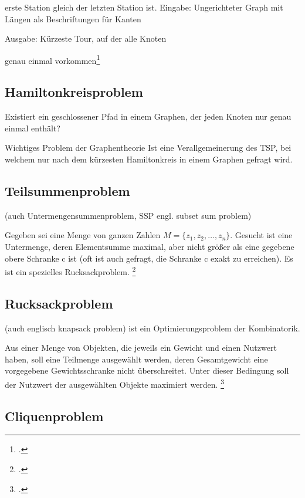 \documentclass{lehramt-informatik-haupt}
\begin{document}
erste Station gleich der letzten Station ist. Eingabe: Ungerichteter
Graph mit Längen als Beschriftungen für Kanten

Ausgabe: Kürzeste Tour, auf der alle Knoten

genau einmal vorkommen\footcite[Seite 73]{theo:fs:4}

%

\subsection{Hamiltonkreisproblem}

Existiert ein geschlossener Pfad in einem
Graphen, der jeden Knoten nur genau einmal enthält?

Wichtiges Problem der Graphentheorie
Ist eine Verallgemeinerung des TSP, bei welchem nur nach dem kürzesten
Hamiltonkreis in einem Graphen gefragt wird.

%

\subsection{Teilsummenproblem}

(auch Untermengensummenproblem, SSP engl. subset sum problem)

Gegeben sei eine Menge von ganzen Zahlen $M = \{z_1 , z_2 , \dots, z_n
\}$. Gesucht ist eine Untermenge, deren Elementsumme maximal, aber nicht
größer als eine gegebene obere Schranke c ist (oft ist auch gefragt, die
Schranke c exakt zu erreichen). Es ist ein spezielles Rucksackproblem.
\footcite[Seite 74]{theo:fs:4}

%

\subsection{Rucksackproblem}

(auch englisch knapsack problem) ist ein Optimierungsproblem der
Kombinatorik.

Aus einer Menge von Objekten, die jeweils ein Gewicht und einen Nutzwert
haben, soll eine Teilmenge ausgewählt werden, deren Gesamtgewicht eine
vorgegebene Gewichtsschranke nicht überschreitet. Unter dieser Bedingung
soll der Nutzwert der ausgewählten Objekte maximiert werden.
\footcite[Seite 75]{theo:fs:4}

%

\subsection{Cliquenproblem}
\end{document}
